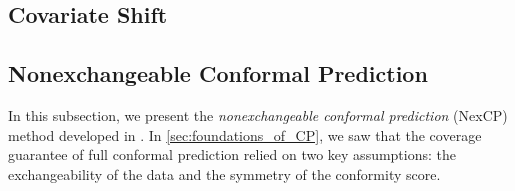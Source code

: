 \documentclass[11pt, titlepage]{article} %
\numberwithin{equation}{section}
\theoremstyle{definition}
\numberwithin{theorem}{section}
\numberwithin{lemma}{section}
\numberwithin{corollary}{section}
\numberwithin{proposition}{section}
\numberwithin{definition}{section}
\numberwithin{remark}{section}
\begin{document}
\subsection{Covariate Shift}

\subsection{Nonexchangeable Conformal Prediction}


In this subsection, we present the \textit{nonexchangeable conformal prediction} (NexCP) method developed in \cite{barber2023conformalbeyondexch}. In \cref{sec:foundations_of_CP}, we saw that the coverage guarantee of full conformal prediction relied on two key assumptions: the exchangeability of the data and the symmetry of the conformity score.




\vfill \eject

%                                                                             
%                                                                             


\nocite{*}
\printbibliography

\end{document}
